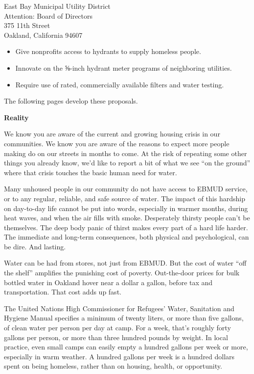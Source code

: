 \documentclass[letterpaper]{letter}
\begin{document}
\begin{letter}{%
    East Bay Municipal Utility District\\
    Attention: Board of Directors\\
    375 11th Street\\
    Oakland, California 94607}
\begin{samepage}
    \begin{itemize}
      \item Give nonprofits access to hydrants to supply homeless people.
      \item Innovate on the ⅝-inch hydrant meter programs of neighboring utilities.
      \item Require use of rated, commercially available filters and water testing.
    \end{itemize}

    The following pages develop these proposals.
    \end{samepage}

    \stopbreaks
    \textbf{Reality}

    We know you are aware of the current and growing housing crisis in our communities. We know you are aware of the reasons to expect more people making do on our streets in months to come. At the risk of repeating some other things you already know, we’d like to report a bit of what we see “on the ground” where that crisis touches the basic human need for water.
    \startbreaks

    Many unhoused people in our community do not have access to EBMUD service, or to any regular, reliable, and safe source of water. The impact of this hardship on day-to-day life cannot be put into words, especially in warmer months, during heat waves, and when the air fills with smoke. Desperately thirsty people can’t be themselves. The deep body panic of thirst makes every part of a hard life harder. The immediate and long-term consequences, both physical and psychological, can be dire. And lasting.

    Water can be had from stores, not just from EBMUD. But the cost of water “off the shelf” amplifies the punishing cost of poverty. Out-the-door prices for bulk bottled water in Oakland hover near a dollar a gallon, before tax and transportation. That cost adds up fast.

    The United Nations High Commissioner for Refugees’ Water, Sanitation and Hygiene Manual specifies a minimum of twenty liters, or more than five gallons, of clean water per person per day at camp. For a week, that’s roughly forty gallons per person, or more than three hundred pounds by weight. In local practice, even small camps can easily empty a hundred gallons per week or more, especially in warm weather. A hundred gallons per week is a hundred dollars spent on being homeless, rather than on housing, health, or opportunity.


\end{letter}
\end{document}
